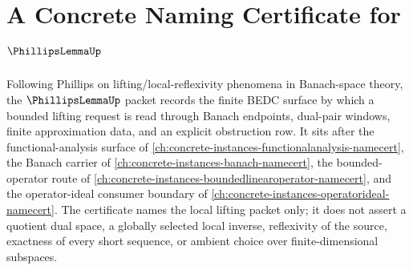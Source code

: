 \chapter{A Concrete Naming Certificate for $\PhillipsLemmaUp$}
\label{ch:concrete-instances-phillips-lemma-namecert}

Following Phillips on lifting/local-reflexivity phenomena in Banach-space theory, the $\PhillipsLemmaUp$ packet records the finite BEDC surface by which a bounded lifting request is read through Banach endpoints, dual-pair windows, finite approximation data, and an explicit obstruction row. It sits after the functional-analysis surface of \autoref{ch:concrete-instances-functionalanalysis-namecert}, the Banach carrier of \autoref{ch:concrete-instances-banach-namecert}, the bounded-operator route of \autoref{ch:concrete-instances-boundedlinearoperator-namecert}, and the operator-ideal consumer boundary of \autoref{ch:concrete-instances-operatorideal-namecert}. The certificate names the local lifting packet only; it does not assert a quotient dual space, a globally selected local inverse, reflexivity of the source, exactness of every short sequence, or ambient choice over finite-dimensional subspaces.


